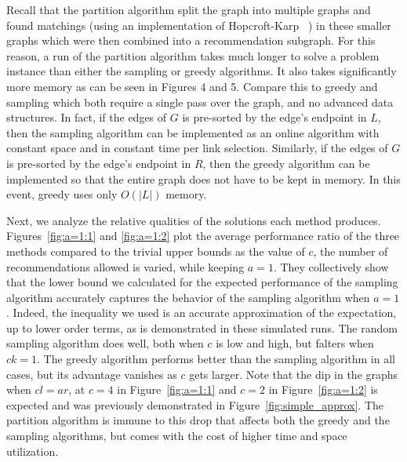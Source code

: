Recall that the partition algorithm split the graph into multiple graphs
and found matchings (using an implementation of Hopcroft-Karp ~\cite{HopcroftKarp}) 
in these smaller graphs which were then combined into
a recommendation subgraph. For this reason, a run of the partition
algorithm takes much longer to solve a problem instance than either the
sampling or greedy algorithms. It also takes significantly more memory as can be seen in Figures 4 and 5.
Compare this to greedy and sampling which both require a single pass over
the graph, and no advanced data structures. In fact, if the edges
of $G$ is pre-sorted by the edge's endpoint in $L$, then the sampling algorithm can be
implemented as an online algorithm with constant space and in constant time 
per link selection. Similarly, if the edges of $G$
is pre-sorted by the edge's endpoint in $R$, then the greedy algorithm can
be implemented so that the entire graph does not have to be kept in memory. In this
event, greedy uses only $O(|L|)$ memory. \vs

Next, we analyze the relative qualities of the solutions each method
produces.  Figures~\ref{fig:a=1:1} and \ref{fig:a=1:2} plot the
average performance ratio of the three methods compared to the trivial
upper bounds as the value of $c$, the number of recommendations
allowed is varied, while keeping $a = 1$.
They collectively show that the lower bound we calculated for the
expected performance of the sampling algorithm accurately captures the
behavior of the sampling algorithm when $a=1$. Indeed, the inequality
we used is an accurate approximation of the expectation, up to lower
order terms, as is demonstrated in these simulated runs.  The random
sampling algorithm does well, both when $c$ is low and high, but
falters when $ck=1$. The greedy algorithm performs better than the
sampling algorithm in all cases, but its advantage vanishes as
$c$ gets larger. Note that the dip in the graphs when $cl=ar$, at
$c=4$ in Figure~\ref{fig:a=1:1} and $c=2$ in Figure~\ref{fig:a=1:2} is
expected and was previously demonstrated in
Figure~\ref{fig:simple_approx}.  The partition algorithm is immune to
this drop that affects both the greedy and the sampling algorithms,
but comes with the cost of higher time and space utilization.\vs


